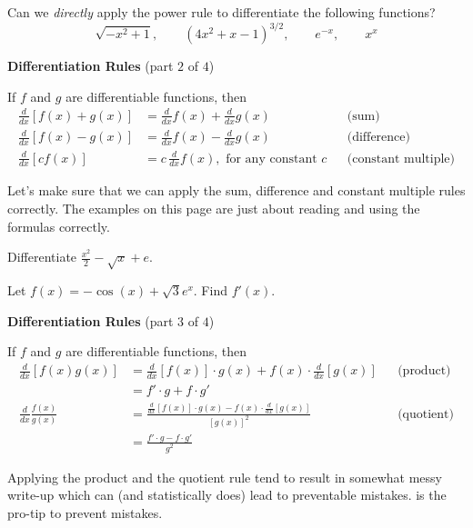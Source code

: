 \documentclass[../main.tex]{subfiles}
\begin{document}
  \begin{example}
    Can we \emph{directly} apply the power rule to differentiate the following functions?
    \[
      \sqrt{-x^{2} + 1}, \qquad (4x^{2} + x - 1)^{3/2}, \qquad e^{-x}, \qquad x^{x}
    \]

  \end{example}

  \begin{mdframed}[style=simple]
    \textbf{Differentiation Rules} \hfill {\footnotesize (part \(2\) of \(4\))}

    If \(f\) and \(g\) are differentiable functions, then
    \begin{align*}
      \frac{d}{dx} [f(x) + g(x)] 
    &= \frac{d}{dx}f(x) + \frac{d}{dx}g(x)
    && \text{(sum)} \\[1em]
    \frac{d}{dx} [f(x) - g(x)] 
    &= \frac{d}{dx}f(x) - \frac{d}{dx}g(x)
    && \text{(difference)} \\[1em]
    \frac{d}{dx} [c f(x)] 
    &= c \, \frac{d}{dx} f(x), \text{ for any constant \(c\)}
    && \text{(constant multiple)}
    \end{align*}
  \end{mdframed}
  Let's make sure that we can apply the sum, difference and constant multiple rules correctly. The examples on this page are just about reading and using the formulas correctly. 

  \begin{example}
    Differentiate \(\frac{x^{2}}{2} - \sqrt{x} + e\).

  \end{example}

  \begin{example}
    Let \(f(x) = -\cos(x) + \sqrt{3} e^{x}\).  Find \(f'(x)\).

  \end{example}
  \clearpage

  \begin{mdframed}[style=simple]
    \textbf{Differentiation Rules} \hfill {\footnotesize (part \(3\) of \(4\))}

    If \(f\) and \(g\) are differentiable functions, then
    \begin{align*}
      \frac{d}{dx} [f(x)g(x)] 
    &= { \frac{d}{dx} [f(x)] \cdot g(x)+ f(x) \cdot \frac{d}{dx}[g(x)]}
    && \text{(product)} \\
    &= f' \cdot g + f \cdot g' \\[1em]
    \frac{d}{dx} \frac{f(x)}{g(x)}
    &= {\frac{\frac{d}{dx} [f(x)] \cdot g(x) - f(x) \cdot \frac{d}{dx}[g(x)] }{ [g(x)]^{2} }}
    && \text{(quotient)} \\
    &= \frac{f' \cdot g - f \cdot g'}{g^{2}}
    \end{align*}
  \end{mdframed}
  Applying the product and the quotient rule tend to result in somewhat messy write-up which can (and statistically does) lead to preventable mistakes.  is the pro-tip to prevent mistakes.
\end{document}
